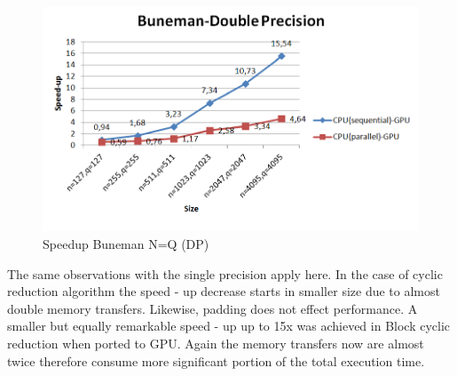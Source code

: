 \begin{figure}[H]
   \centering
       \includegraphics[width=1\textwidth]{grafhmata/buneman_dp_speedup_nq.png}
   \caption{Speedup Buneman N=Q (DP)}
   \label{fig:Speedup Buneman N=Q (DP)}
\end{figure}
The same observations with the single precision apply here. In the case of cyclic reduction algorithm the speed - up decrease starts in smaller size due to almost double memory transfers. Likewise, padding does not effect performance.
 A smaller but equally remarkable speed - up up to 15x was achieved in Block cyclic reduction when ported to GPU. Again the memory transfers now are almost twice therefore consume more significant portion of the total execution time.
